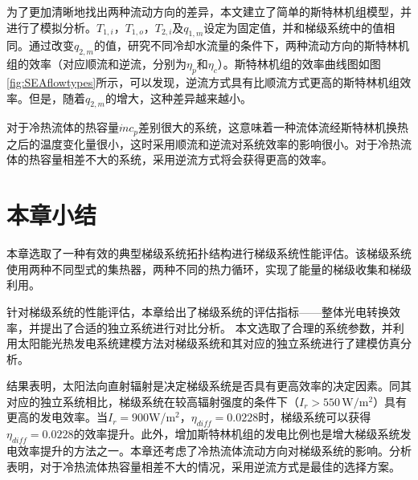 为了更加清晰地找出两种流动方向的差异，本文建立了简单的斯特林机组模型，并进行了模拟分析。$T_{1,i}，T_{1,o}，T_{2,i}及q_{1,m}$设定为固定值，并和梯级系统中的值相同。通过改变$q_{2,m}$的值，研究不同冷却水流量的条件下，两种流动方向的斯特林机组的效率（对应顺流和逆流，分别为$\eta_p$和$\eta_c$）。斯特林机组的效率曲线图如图\ref{fig:SEAflowtypes}所示，可以发现，逆流方式具有比顺流方式更高的斯特林机组效率。但是，随着$q_{2,m}$的增大，这种差异越来越小。

对于冷热流体的热容量$\dot{m}c_p$差别很大的系统，这意味着一种流体流经斯特林机换热之后的温度变化量很小，这时采用顺流和逆流对系统效率的影响很小。对于冷热流体的热容量相差不大的系统，采用逆流方式将会获得更高的效率。

\section{本章小结}

本章选取了一种有效的典型梯级系统拓扑结构进行梯级系统性能评估。该梯级系统使用两种不同型式的集热器，两种不同的热力循环，实现了能量的梯级收集和梯级利用。

针对梯级系统的性能评估，本章给出了梯级系统的评估指标——整体光电转换效率，并提出了合适的独立系统进行对比分析。
本文选取了合理的系统参数，并利用太阳能光热发电系统建模方法对梯级系统和其对应的独立系统进行了建模仿真分析。

结果表明，太阳法向直射辐射是决定梯级系统是否具有更高效率的决定因素。同其对应的独立系统相比，梯级系统在较高辐射强度的条件下（$I_r > 550\,\mathrm{W/m^2}$）具有更高的发电效率。当$I_r=900$W/m$^2$，$\eta_{diff}=0.0228$时，梯级系统可以获得$\eta_{diff}=0.0228$的效率提升。此外，增加斯特林机组的发电比例也是增大梯级系统发电效率提升的方法之一。本章还考虑了冷热流体流动方向对梯级系统的影响。分析表明，对于冷热流体热容量相差不大的情况，采用逆流方式是最佳的选择方案。

